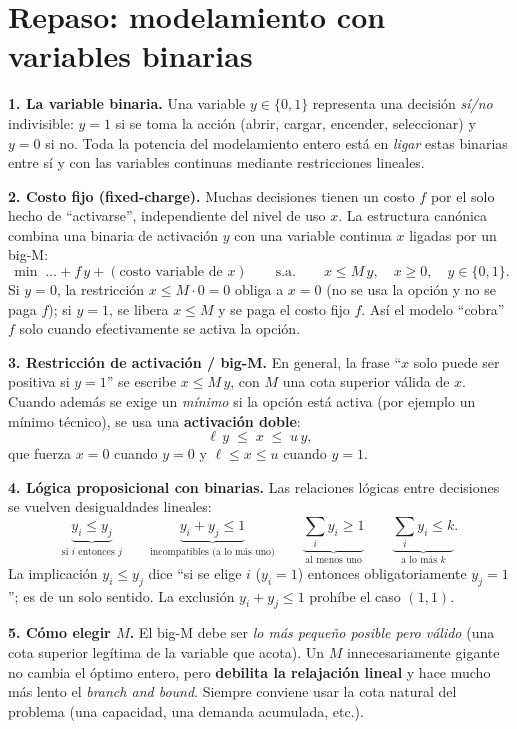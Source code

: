 \documentclass[11pt]{article}
\begin{document}
\section*{Repaso: modelamiento con variables binarias}

\noindent\textbf{1. La variable binaria.} Una variable $y\in\{0,1\}$ representa una decisión \emph{sí/no} indivisible: $y=1$ si se toma la acción (abrir, cargar, encender, seleccionar) y $y=0$ si no. Toda la potencia del modelamiento entero está en \emph{ligar} estas binarias entre sí y con las variables continuas mediante restricciones lineales.

\smallskip
\noindent\textbf{2. Costo fijo (fixed-charge).} Muchas decisiones tienen un costo $f$ por el solo hecho de ``activarse'', independiente del nivel de uso $x$. La estructura canónica combina una binaria de activación $y$ con una variable continua $x$ ligadas por un big-M:
\[
\min \; \dots + f\,y + (\text{costo variable de } x)
\qquad\text{s.a.}\qquad
x \le M\,y,\quad x\ge 0,\quad y\in\{0,1\}.
\]
Si $y=0$, la restricción $x\le M\cdot 0=0$ obliga a $x=0$ (no se usa la opción y no se paga $f$); si $y=1$, se libera $x\le M$ y se paga el costo fijo $f$. Así el modelo ``cobra'' $f$ solo cuando efectivamente se activa la opción.

\smallskip
\noindent\textbf{3. Restricción de activación / big-M.} En general, la frase ``$x$ solo puede ser positiva si $y=1$'' se escribe $x \le M\,y$, con $M$ una cota superior válida de $x$. Cuando además se exige un \emph{mínimo} si la opción está activa (por ejemplo un mínimo técnico), se usa una \textbf{activación doble}:
\[
\ell\,y \;\le\; x \;\le\; u\,y,
\]
que fuerza $x=0$ cuando $y=0$ y $\ell \le x \le u$ cuando $y=1$.

\smallskip
\noindent\textbf{4. Lógica proposicional con binarias.} Las relaciones lógicas entre decisiones se vuelven desigualdades lineales:
\[
\underbrace{y_i \le y_j}_{\text{si }i\text{ entonces }j}
\qquad
\underbrace{y_i + y_j \le 1}_{\text{incompatibles (a lo más uno)}}
\qquad
\underbrace{\textstyle\sum_i y_i \ge 1}_{\text{al menos uno}}
\qquad
\underbrace{\textstyle\sum_i y_i \le k}_{\text{a lo más }k}.
\]
La implicación $y_i\le y_j$ dice ``si se elige $i$ ($y_i=1$) entonces obligatoriamente $y_j=1$''; es de un solo sentido. La exclusión $y_i+y_j\le1$ prohíbe el caso $(1,1)$.

\smallskip
\noindent\textbf{5. Cómo elegir $M$.} El big-M debe ser \emph{lo más pequeño posible pero válido} (una cota superior legítima de la variable que acota). Un $M$ innecesariamente gigante no cambia el óptimo entero, pero \textbf{debilita la relajación lineal} y hace mucho más lento el \emph{branch and bound}. Siempre conviene usar la cota natural del problema (una capacidad, una demanda acumulada, etc.).
\end{document}
